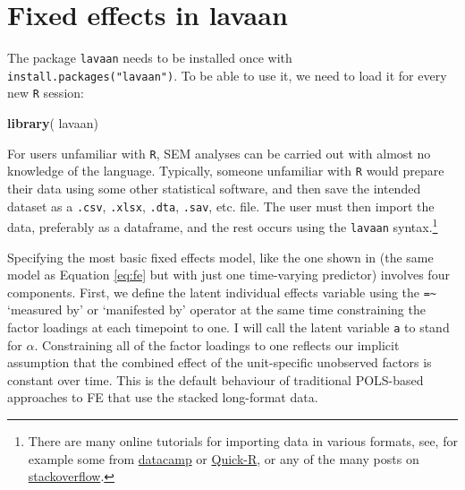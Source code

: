 \documentclass[]{interact}
\theoremstyle{plain}%
\theoremstyle{definition}
\theoremstyle{remark}
\newenvironment{Shaded}{\begin{snugshade}}{\end{snugshade}}
\newcommand{\KeywordTok}[1]{\textcolor[rgb]{0.13,0.29,0.53}{\textbf{#1}}}
\newcommand{\NormalTok}[1]{#1}
\begin{document}
\hypertarget{fesem}{%
\section{Fixed effects in lavaan}\label{fesem}}

The package \texttt{lavaan} needs to be installed once with
\texttt{install.packages("lavaan")}. To be able to use it, we need to
load it for every new \texttt{R} session:

\singlespacing

\begin{Shaded}
\begin{Highlighting}[]
\KeywordTok{library}\NormalTok{( lavaan)}
\end{Highlighting}
\end{Shaded}

\doublespacing

For users unfamiliar with \texttt{R}, SEM analyses can be carried out
with almost no knowledge of the language. Typically, someone unfamiliar
with \texttt{R} would prepare their data using some other statistical
software, and then save the intended dataset as a \texttt{.csv},
\texttt{.xlsx}, \texttt{.dta}, \texttt{.sav}, etc. file. The user must
then import the data, preferably as a dataframe, and the rest occurs
using the \texttt{lavaan} syntax.\footnote{There are many online
  tutorials for importing data in various formats, see, for example some
  from
  \href{https://www.datacamp.com/community/tutorials/r-data-import-tutorial}{datacamp}
  or
  \href{https://www.statmethods.net/input/importingdata.html}{Quick-R},
  or any of the many posts on
  \href{https://stackoverflow.com/search?q=r+import+data}{stackoverflow}.}

Specifying the most basic fixed effects model, like the one shown in
\citet{Bollen2010} (the same model as Equation \eqref{eq:fe} but with
just one time-varying predictor) involves four components. First, we
define the latent individual effects variable using the
\texttt{=\textasciitilde{}} `measured by' or `manifested by'
\citep{R-lavaan} operator at the same time constraining the factor
loadings at each timepoint to one. I will call the latent variable
\texttt{a} to stand for \(\alpha\). Constraining all of the factor
loadings to one reflects our implicit assumption that the combined
effect of the unit-specific unobserved factors is constant over time.
This is the default behaviour of traditional POLS-based approaches to FE
that use the stacked long-format data.

\singlespacing
\end{document}
